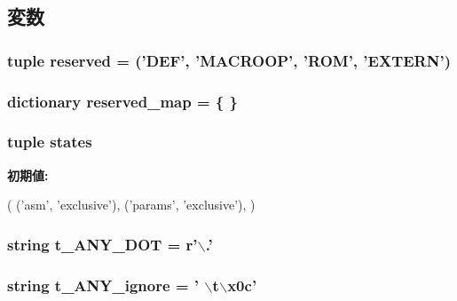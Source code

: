 \subsection{変数}
\hypertarget{namespacemicro__asm_a7c0da508b820c6b4db51430d694f6d8b}{
\subsubsection[{reserved}]{\setlength{\rightskip}{0pt plus 5cm}tuple {\bf reserved} = ('DEF', 'MACROOP', 'ROM', 'EXTERN')}}
\label{namespacemicro__asm_a7c0da508b820c6b4db51430d694f6d8b}
\hypertarget{namespacemicro__asm_a2fce270f6ee4bafd620b1b2f00cd9b79}{
\subsubsection[{reserved\_\-map}]{\setlength{\rightskip}{0pt plus 5cm}dictionary {\bf reserved\_\-map} = \{ \}}}
\label{namespacemicro__asm_a2fce270f6ee4bafd620b1b2f00cd9b79}
\hypertarget{namespacemicro__asm_a998242a7605823c08ad1630923b570d5}{
\subsubsection[{states}]{\setlength{\rightskip}{0pt plus 5cm}tuple {\bf states}}}
\label{namespacemicro__asm_a998242a7605823c08ad1630923b570d5}
{\bfseries 初期値:}
\begin{DoxyCode}
(
    ('asm', 'exclusive'),
    ('params', 'exclusive'),
)
\end{DoxyCode}
\hypertarget{namespacemicro__asm_a552c7d03bd35ff56963494e8cdd840c1}{
\subsubsection[{t\_\-ANY\_\-DOT}]{\setlength{\rightskip}{0pt plus 5cm}string {\bf t\_\-ANY\_\-DOT} = r'$\backslash$.'}}
\label{namespacemicro__asm_a552c7d03bd35ff56963494e8cdd840c1}
\hypertarget{namespacemicro__asm_a65d7419bbffa21f7c4406f5518092c9b}{
\subsubsection[{t\_\-ANY\_\-ignore}]{\setlength{\rightskip}{0pt plus 5cm}string {\bf t\_\-ANY\_\-ignore} = ' $\backslash$t$\backslash$x0c'}}
